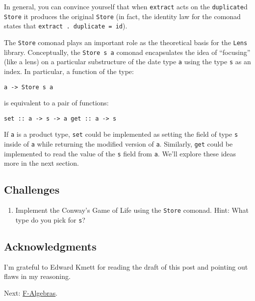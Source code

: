 In general, you can convince yourself that when \texttt{extract} acts on
the \texttt{duplicate}d \texttt{Store} it produces the original
\texttt{Store} (in fact, the identity law for the comonad states that
\texttt{extract\ .\ duplicate\ =\ id}).

The \texttt{Store} comonad plays an important role as the theoretical
basis for the \texttt{Lens} library. Conceptually, the
\texttt{Store\ s\ a} comonad encapsulates the idea of ``focusing'' (like
a lens) on a particular substructure of the date type \texttt{a} using
the type \texttt{s} as an index. In particular, a function of the type:

\begin{verbatim}
a -> Store s a
\end{verbatim}

is equivalent to a pair of functions:

\begin{verbatim}
set :: a -> s -> a get :: a -> s
\end{verbatim}

If \texttt{a} is a product type, \texttt{set} could be implemented as
setting the field of type \texttt{s} inside of \texttt{a} while
returning the modified version of \texttt{a}. Similarly, \texttt{get}
could be implemented to read the value of the \texttt{s} field from
\texttt{a}. We'll explore these ideas more in the next section.

\subsection{Challenges}\label{challenges}

\begin{enumerate}
\tightlist
\item
  Implement the Conway's Game of Life using the \texttt{Store} comonad.
  Hint: What type do you pick for \texttt{s}?
\end{enumerate}

\subsection{Acknowledgments}\label{acknowledgments}

I'm grateful to Edward Kmett for reading the draft of this post and
pointing out flaws in my reasoning.

Next:
\href{https://bartoszmilewski.com/2017/02/28/f-algebras/}{F-Algebras}.
